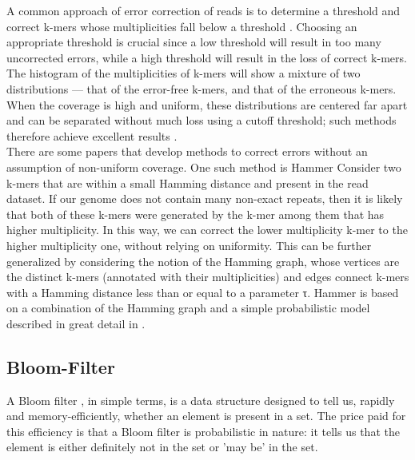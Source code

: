 \documentclass[11pt]{article}
\begin{document}
A common approach of error correction of reads is to determine a threshold and correct k-mers whose multiplicities fall below a threshold \cite{chikhi,quake,musket}. Choosing an appropriate threshold is crucial since a low threshold will result in too many uncorrected errors, while a high threshold will result in the loss of correct k-mers. The histogram of the multiplicities of k-mers will show a mixture of two distributions — that of the error-free k-mers, and that of the erroneous k-mers. When the coverage is high and uniform, these distributions are centered far apart and can be separated without much loss using a cutoff threshold; such methods therefore achieve excellent results \cite{quake}. \\

There are some papers that develop methods to correct errors without an assumption of non-uniform coverage. One such method is Hammer \cite{hammer}
Consider two k-mers that are within a small Hamming distance and present in the read dataset. If our genome does not contain many non-exact repeats, then it is likely that both of these k-mers were generated by the k-mer among them that has higher multiplicity. In this way, we can correct the lower multiplicity k-mer to the higher multiplicity one, without relying on uniformity. This can be further generalized by considering the notion of the Hamming graph, whose vertices are the distinct k-mers (annotated with their multiplicities) and edges connect k-mers with a Hamming distance less than or equal to a parameter τ. Hammer is based on a combination of the Hamming graph and a simple probabilistic model described in great detail in \cite{hammer}.

\subsection{Bloom-Filter}
A Bloom filter \cite{bloom}, in simple terms, is a data structure designed to tell us, rapidly and memory-efficiently, whether an element is present in a set. The price paid for this efficiency is that a Bloom filter is probabilistic in nature: it tells us that the element is either definitely not in the set or 'may be' in the set.
\end{document}
